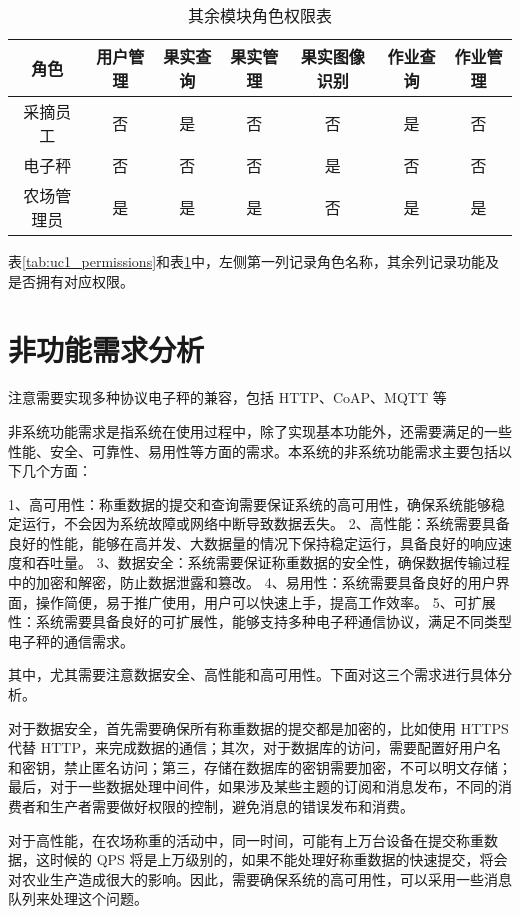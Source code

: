 \begin{table}[ht]
\centering
\begin{tabular}{|c|c|c|c|c|c|c|}
\hline
角色 & 用户管理 & 果实查询 & 果实管理 & 果实图像识别 & 作业查询 & 作业管理 \\
\hline
采摘员工 & 否 & 是 & 否 & 否 & 是 & 否 \\
\hline
电子秤 & 否 & 否 & 否 & 是 & 否 & 否 \\
\hline
农场管理员 & 是 & 是 & 是 & 否 & 是 & 是 \\
\hline
\end{tabular}
\vspace{10pt}
\caption{其余模块角色权限表}
\label{tab:uco_permissions}
\end{table}

表\ref{tab:uc1_permissions}和表\ref{tab:uco_permissions}中，左侧第一列记录角色名称，其余列记录功能及是否拥有对应权限。

\section{非功能需求分析}

注意需要实现多种协议电子秤的兼容，包括 HTTP、CoAP、MQTT 等

非系统功能需求是指系统在使用过程中，除了实现基本功能外，还需要满足的一些性能、安全、可靠性、易用性等方面的需求。本系统的非系统功能需求主要包括以下几个方面：

1、高可用性：称重数据的提交和查询需要保证系统的高可用性，确保系统能够稳定运行，不会因为系统故障或网络中断导致数据丢失。
2、高性能：系统需要具备良好的性能，能够在高并发、大数据量的情况下保持稳定运行，具备良好的响应速度和吞吐量。
3、数据安全：系统需要保证称重数据的安全性，确保数据传输过程中的加密和解密，防止数据泄露和篡改。
4、易用性：系统需要具备良好的用户界面，操作简便，易于推广使用，用户可以快速上手，提高工作效率。
5、可扩展性：系统需要具备良好的可扩展性，能够支持多种电子秤通信协议，满足不同类型电子秤的通信需求。

其中，尤其需要注意数据安全、高性能和高可用性。下面对这三个需求进行具体分析。

对于数据安全，首先需要确保所有称重数据的提交都是加密的，比如使用 HTTPS 代替 HTTP，来完成数据的通信；其次，对于数据库的访问，需要配置好用户名和密钥，禁止匿名访问；第三，存储在数据库的密钥需要加密，不可以明文存储；最后，对于一些数据处理中间件，如果涉及某些主题的订阅和消息发布，不同的消费者和生产者需要做好权限的控制，避免消息的错误发布和消费。

对于高性能，在农场称重的活动中，同一时间，可能有上万台设备在提交称重数据，这时候的 QPS 将是上万级别的，如果不能处理好称重数据的快速提交，将会对农业生产造成很大的影响。因此，需要确保系统的高可用性，可以采用一些消息队列来处理这个问题。

